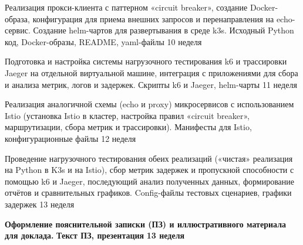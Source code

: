 {   \projecttask{\projectsubtasknum}%
   {Реализация прокси-клиента с паттерном «circuit breaker», создание Docker-образа, конфигурация для приема внешних запросов и перенаправления на echo-сервис. Создание helm-чартов для развертывания в среде k3s.}%
   {Исходный Python код, Docker-образы, README, yaml-файлы}%
   {10 неделя}{}%
 
   \projecttask{\projectsubtasknum}%
   {Подготовка и настройка системы нагрузочного тестирования k6 и трассировки Jaeger на отдельной виртуальной машине, интеграция с приложениями для сбора и анализа метрик, логов и задержек.}%
   {Скрипты k6 и Jaeger, helm-чарты}%
   {11 неделя}{}%
 
   \projecttask{\projectsubtasknum}%
   {Реализация аналогичной схемы (echo и proxy) микросервисов с использованием Istio (установка Istio в кластер, настройка правил «circuit breaker», маршрутизации, сбора метрик и трассировки).}%
   {Манифесты для Istio, конфигурационные файлы}%
   {12 неделя}{}%
 
   \projecttask{\projectsubtasknum}%
   {Проведение нагрузочного тестирования обеих реализаций («чистая» реализация на Python в K3s и на Istio), сбор метрик задержек и пропускной способности с помощью k6 и Jaeger, последующий анализ полученных данных, формирование отчётов и сравнительных графиков.}%
   {Config-файлы тестовых сценариев, графики задержек}%
   {13 неделя}{}%
 
   \projecttask{\bfseries\projecttasknum}%
   {\bfseries Оформление пояснительной записки (ПЗ) и иллюстративного материала
     для доклада.}%
   {\bfseries Текст ПЗ, презентация}%
   {\bfseries 13 неделя}{}%
 }
 
 \taskliterature{
  \nocite{Kleppmann2017}
  \nocite{Hightower2017}
  \nocite{Calcote2020}
  \nocite{Richardson2018}
  \nocite{Molyneaux2011}
  \nocite{k6book}
 }
 



\authortaskapproval{}%
\supervisortaskapproval{}%


